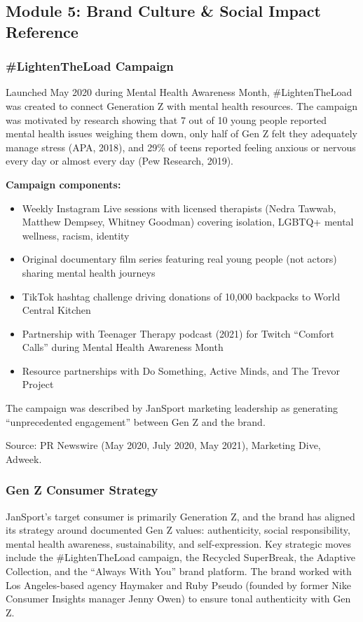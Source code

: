 \documentclass[11pt,letterpaper]{article}
\begin{document}
\subsection{Module 5: Brand Culture \& Social Impact Reference}

\subsubsection{\#LightenTheLoad Campaign}

Launched May 2020 during Mental Health Awareness Month, \#LightenTheLoad was created to connect Generation Z with mental health resources. The campaign was motivated by research showing that 7 out of 10 young people reported mental health issues weighing them down, only half of Gen Z felt they adequately manage stress (APA, 2018), and 29\% of teens reported feeling anxious or nervous every day or almost every day (Pew Research, 2019).

\textbf{Campaign components:}

\begin{itemize}[nosep]
  \item Weekly Instagram Live sessions with licensed therapists (Nedra Tawwab, Matthew Dempsey, Whitney Goodman) covering isolation, LGBTQ+ mental wellness, racism, identity
  \item Original documentary film series featuring real young people (not actors) sharing mental health journeys
  \item TikTok hashtag challenge driving donations of 10,000 backpacks to World Central Kitchen
  \item Partnership with Teenager Therapy podcast (2021) for Twitch ``Comfort Calls'' during Mental Health Awareness Month
  \item Resource partnerships with Do Something, Active Minds, and The Trevor Project
\end{itemize}

The campaign was described by JanSport marketing leadership as generating ``unprecedented engagement'' between Gen Z and the brand.

Source: PR Newswire (May 2020, July 2020, May 2021), Marketing Dive, Adweek.

\subsubsection{Gen Z Consumer Strategy}

JanSport's target consumer is primarily Generation Z, and the brand has aligned its strategy around documented Gen Z values: authenticity, social responsibility, mental health awareness, sustainability, and self-expression. Key strategic moves include the \#LightenTheLoad campaign, the Recycled SuperBreak, the Adaptive Collection, and the ``Always With You'' brand platform. The brand worked with Los Angeles-based agency Haymaker and Ruby Pseudo (founded by former Nike Consumer Insights manager Jenny Owen) to ensure tonal authenticity with Gen Z.
\end{document}
